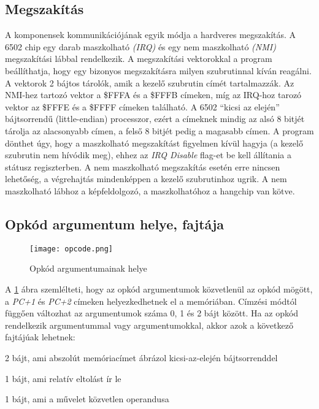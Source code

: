 \subsection{Megszakítás \cite{6502desc} \cite{cpumem}}
A komponensek kommunikációjának egyik módja a hardveres megszakítás.
A 6502 chip egy darab maszkolható \emph{(IRQ)} és egy nem maszkolható \emph{(NMI)} megszakítási lábbal rendelkezik.
A megszakítási vektorokkal a program beállíthatja, hogy egy bizonyos megszakításra milyen szubrutinnal kíván reagálni. A vektorok 2 bájtos tárolók, amik a kezelő szubrutin címét tartalmazzák. Az NMI-hez tartozó vektor a \$FFFA és a \$FFFB címeken, míg az IRQ-hoz tarozó vektor az \$FFFE és a \$FFFF címeken található. A 6502 ``kicsi az elején'' bájtsorrendű (little-endian) processzor, ezért a címeknek mindig az alsó 8 bitjét tárolja az alacsonyabb címen, a felső 8 bitjét pedig a magasabb címen.
A program dönthet úgy, hogy a maszkolható megszakítást figyelmen kívül hagyja (a kezelő szubrutin nem hívódik meg), ehhez az \emph{IRQ Disable} flag-et be kell állítania a státusz regiszterben. A nem maszkolható megszakítás esetén erre nincsen lehetőség, a végrehajtás mindenképpen a kezelő szubrutinhoz ugrik.
A nem maszkolható lábhoz a képfeldolgozó, a maszkolhatóhoz a hangchip van kötve.

\subsection{Opkód argumentum helye, fajtája}

\begin{figure}[H]
	\centering
	\texttt{[image: opcode.png]}
	\caption{Opkód argumentumainak helye}
	\label{fig:argplacement}
\end{figure}

A \ref{fig:argplacement} ábra szemlélteti, hogy az opkód argumentumok közvetlenül az opkód mögött, a \emph{PC+1} és \emph{PC+2} címeken helyezkedhetnek el a memóriában. Címzési módtól függően változhat az argumentumok száma 0, 1 és 2 bájt között.
Ha az opkód rendelkezik argumentummal vagy argumentumokkal, akkor azok a következő fajtájúak lehetnek:

\begin{compactitem}
	\item 2 bájt, ami abszolút memóriacímet ábrázol kicsi-az-elején bájtsorrenddel 
	\item 1 bájt, ami relatív eltolást ír le
	\item 1 bájt, ami a művelet közvetlen operandusa
\end{compactitem}

